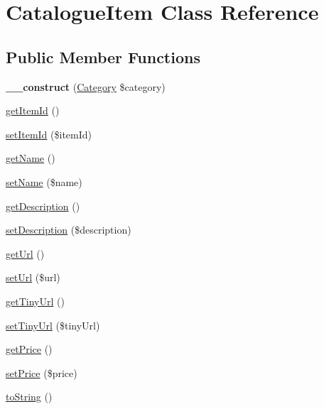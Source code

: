 \hypertarget{class_catalogue_item}{\section{Catalogue\+Item Class Reference}
\label{class_catalogue_item}
}
\subsection*{Public Member Functions}
\begin{DoxyCompactItemize}
\item 
\hypertarget{class_catalogue_item_a14e1eb3a2c7c9e66ad3aed41923064aa}{{\bfseries \+\_\+\+\_\+construct} (\hyperlink{class_category}{Category} \$category)}\label{class_catalogue_item_a14e1eb3a2c7c9e66ad3aed41923064aa}

\item 
\hyperlink{class_catalogue_item_a5b01110117f0cd71a5a115dc8b9eab6f}{get\+Item\+Id} ()
\item 
\hyperlink{class_catalogue_item_a22de7a673c95892b16b497788139add1}{set\+Item\+Id} (\$item\+Id)
\item 
\hyperlink{class_catalogue_item_a3d0963e68bb313b163a73f2803c64600}{get\+Name} ()
\item 
\hyperlink{class_catalogue_item_a2fe666694997d047711d7653eca2f132}{set\+Name} (\$name)
\item 
\hyperlink{class_catalogue_item_a2e7bb35c71bf1824456ceb944cb7a845}{get\+Description} ()
\item 
\hyperlink{class_catalogue_item_a31fad3e39336ea079ea758e051866627}{set\+Description} (\$description)
\item 
\hyperlink{class_catalogue_item_accd14bda49a1044b4d8dd93f020f11ee}{get\+Url} ()
\item 
\hyperlink{class_catalogue_item_a0b6d0c531aa70b1811b166299edab8d0}{set\+Url} (\$url)
\item 
\hyperlink{class_catalogue_item_a091447bbcaa0d446868dad1498b44c01}{get\+Tiny\+Url} ()
\item 
\hyperlink{class_catalogue_item_aa324ef58c503db9ab7a00323b15f3d91}{set\+Tiny\+Url} (\$tiny\+Url)
\item 
\hyperlink{class_catalogue_item_a38146d2beb1dd6dfd0f2a5886e18a538}{get\+Price} ()
\item 
\hyperlink{class_catalogue_item_a2e232712bdbc759793fab2cf08506c25}{set\+Price} (\$price)
\item 
\hyperlink{class_catalogue_item_a5558c5d549f41597377fa1ea8a1cefa3}{to\+String} ()
\end{DoxyCompactItemize}

